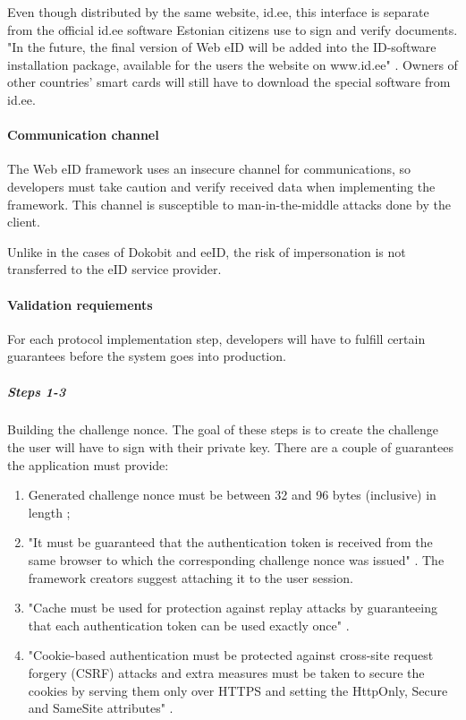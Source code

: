 Even though distributed by the same website, id.ee, this interface is separate from the official id.ee software Estonian citizens use to sign and verify documents. "In the future, the final version of Web eID will be added into the ID-software installation package, available for the users the website on www.id.ee" \cite{ria-webeid}. Owners of other countries' smart cards will still have to download the special software from id.ee.

\paragraph{Communication channel}

The Web eID framework uses an insecure channel for communications, so developers must take caution and verify received data when implementing the framework. This channel is susceptible to man-in-the-middle attacks done by the client.

Unlike in the cases of Dokobit and eeID, the risk of impersonation is not transferred to the eID service provider.

\paragraph{Validation requiements}

For each protocol implementation step, developers will have to fulfill certain guarantees before the system goes into production.

\subparagraph{Steps 1-3}

Building the challenge nonce. The goal of these steps is to create the challenge the user will have to sign with their private key. There are a couple of guarantees the application must provide:
\begin{enumerate}
  \item Generated challenge nonce must be between 32 and 96 bytes (inclusive) in length \cite{ria-webeid-source-web-eid-app-authenticate};
  \item "It must be guaranteed that the authentication token is received from the same browser to which the corresponding challenge nonce was issued" \cite{ria-webeid-source-web-eid-authtoken-validation-java-readme}. The framework creators suggest attaching it to the user session.
  \item "Cache must be used for protection against replay attacks by guaranteeing that each authentication token can be used exactly once" \cite{ria-webeid-source-web-eid-authtoken-validation-java-readme}.
  \item "Cookie-based authentication must be protected against cross-site request forgery (CSRF) attacks and extra measures must be taken to secure the cookies by serving them only over HTTPS and setting the HttpOnly, Secure and SameSite attributes" \cite{ria-webeid-source-web-eid-authtoken-validation-java-readme}.
\end{enumerate}

